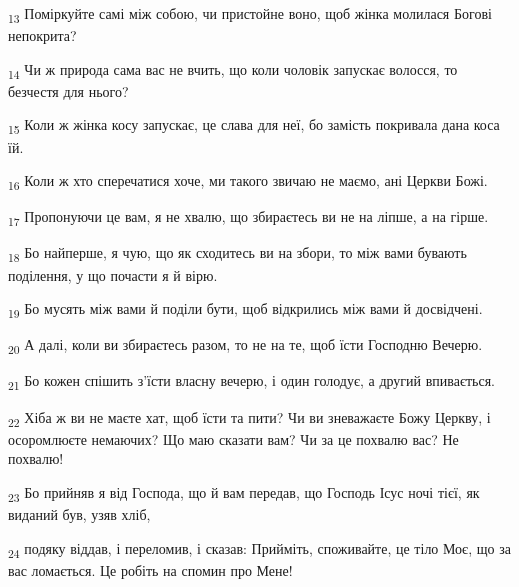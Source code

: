 \begin{tcolorbox}
\textsubscript{13} Поміркуйте самі між собою, чи пристойне воно, щоб жінка молилася Богові непокрита?
\end{tcolorbox}
\begin{tcolorbox}
\textsubscript{14} Чи ж природа сама вас не вчить, що коли чоловік запускає волосся, то безчестя для нього?
\end{tcolorbox}
\begin{tcolorbox}
\textsubscript{15} Коли ж жінка косу запускає, це слава для неї, бо замість покривала дана коса їй.
\end{tcolorbox}
\begin{tcolorbox}
\textsubscript{16} Коли ж хто сперечатися хоче, ми такого звичаю не маємо, ані Церкви Божі.
\end{tcolorbox}
\begin{tcolorbox}
\textsubscript{17} Пропонуючи це вам, я не хвалю, що збираєтесь ви не на ліпше, а на гірше.
\end{tcolorbox}
\begin{tcolorbox}
\textsubscript{18} Бо найперше, я чую, що як сходитесь ви на збори, то між вами бувають поділення, у що почасти я й вірю.
\end{tcolorbox}
\begin{tcolorbox}
\textsubscript{19} Бо мусять між вами й поділи бути, щоб відкрились між вами й досвідчені.
\end{tcolorbox}
\begin{tcolorbox}
\textsubscript{20} А далі, коли ви збираєтесь разом, то не на те, щоб їсти Господню Вечерю.
\end{tcolorbox}
\begin{tcolorbox}
\textsubscript{21} Бо кожен спішить з'їсти власну вечерю, і один голодує, а другий впивається.
\end{tcolorbox}
\begin{tcolorbox}
\textsubscript{22} Хіба ж ви не маєте хат, щоб їсти та пити? Чи ви зневажаєте Божу Церкву, і осоромлюєте немаючих? Що маю сказати вам? Чи за це похвалю вас? Не похвалю!
\end{tcolorbox}
\begin{tcolorbox}
\textsubscript{23} Бо прийняв я від Господа, що й вам передав, що Господь Ісус ночі тієї, як виданий був, узяв хліб,
\end{tcolorbox}
\begin{tcolorbox}
\textsubscript{24} подяку віддав, і переломив, і сказав: Прийміть, споживайте, це тіло Моє, що за вас ломається. Це робіть на спомин про Мене!
\end{tcolorbox}
